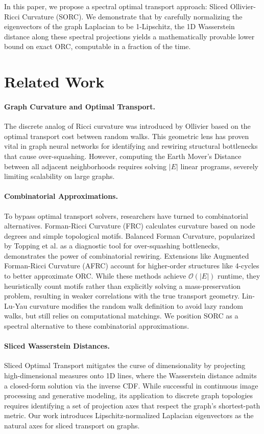 \documentclass{article}
\begin{document}
In this paper, we propose a spectral optimal transport approach: Sliced Ollivier-Ricci Curvature (SORC). We demonstrate that by carefully normalizing the eigenvectors of the graph Laplacian to be 1-Lipschitz, the 1D Wasserstein distance along these spectral projections yields a mathematically provable lower bound on exact ORC, computable in a fraction of the time.

\section{Related Work}

\paragraph{Graph Curvature and Optimal Transport.} The discrete analog of Ricci curvature was introduced by Ollivier \cite{ollivier2009ricci} based on the optimal transport cost between random walks. This geometric lens has proven vital in graph neural networks for identifying and rewiring structural bottlenecks that cause over-squashing. However, computing the Earth Mover's Distance between all adjacent neighborhoods requires solving $|E|$ linear programs, severely limiting scalability on large graphs.

\paragraph{Combinatorial Approximations.} To bypass optimal transport solvers, researchers have turned to combinatorial alternatives. Forman-Ricci Curvature (FRC) calculates curvature based on node degrees and simple topological motifs. Balanced Forman Curvature, popularized by Topping et al. \cite{topping2022understanding} as a diagnostic tool for over-squashing bottlenecks, demonstrates the power of combinatorial rewiring. Extensions like Augmented Forman-Ricci Curvature (AFRC) \cite{fesser2023augmented} account for higher-order structures like 4-cycles to better approximate ORC. While these methods achieve $\mathcal{O}(|E|)$ runtime, they heuristically count motifs rather than explicitly solving a mass-preservation problem, resulting in weaker correlations with the true transport geometry. Lin-Lu-Yau curvature \cite{lin2011ricci} modifies the random walk definition to avoid lazy random walks, but still relies on computational matchings. We position SORC as a spectral alternative to these combinatorial approximations.

\paragraph{Sliced Wasserstein Distances.} Sliced Optimal Transport \cite{kolouri2019generalized} mitigates the curse of dimensionality by projecting high-dimensional measures onto 1D lines, where the Wasserstein distance admits a closed-form solution via the inverse CDF. While successful in continuous image processing and generative modeling, its application to discrete graph topologies requires identifying a set of projection axes that respect the graph's shortest-path metric. Our work introduces Lipschitz-normalized Laplacian eigenvectors as the natural axes for sliced transport on graphs.
\end{document}
